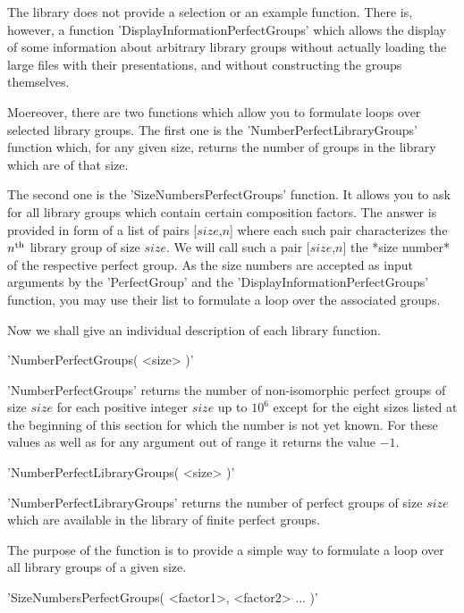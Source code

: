The library  does not provide a selection  or an example function.  There
is, however,  a function 'DisplayInformationPerfectGroups'  which  allows
the  display of some information  about arbitrary  library groups without
actually  loading the large  files  with their presentations, and without
constructing the groups themselves.

Moereover, there are  two functions which  allow  you to formulate  loops
over     selected    library    groups.    The   first    one    is   the
'NumberPerfectLibraryGroups' function which, for  any given size, returns
the number of groups in the library which are of that size.

The second one is the  'SizeNumbersPerfectGroups' function. It allows you
to ask for all library groups which  contain certain composition factors.
The answer is provided in form of a list of pairs [$size$,$n$] where each
such pair  characterizes the $n^{\rm  th}$ library group of  size $size$.
We will call such a pair [$size$,$n$] the *size number* of the respective
perfect group. As the size numbers are accepted as input arguments by the
'PerfectGroup' and  the  'DisplayInformationPerfectGroups'  function, you
may use their list to formulate a loop over the associated groups.

Now we shall give an individual description of each library function.

\vspace{5mm}
'NumberPerfectGroups( <size> )'%

'NumberPerfectGroups' returns the number of non-isomorphic perfect groups
of size $size$ for  each positive integer  $size$ up to $10^6$ except for
the eight  sizes listed at the beginning  of  this section for  which the
number is not yet known. For these values as well as for any argument out
of range it returns the value $-1$.

\vspace{5mm}
'NumberPerfectLibraryGroups( <size> )'%

'NumberPerfectLibraryGroups' returns the number of perfect groups of size
$size$ which are available in the library of finite perfect groups.

The purpose  of the  function  is  to  provide  a simple  way  to
formulate a loop over all library groups of a given size.

\vspace{5mm}
'SizeNumbersPerfectGroups( <factor1>, <factor2> ... )'%

